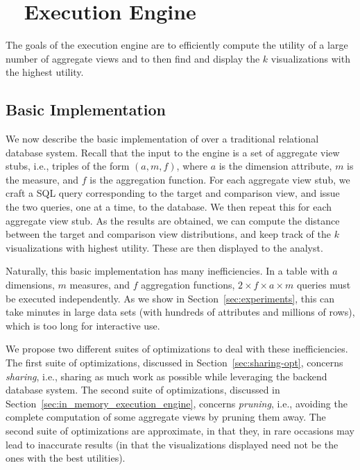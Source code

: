 \section{{\large \SeeDB\ } Execution Engine}
The goals of the \SeeDB execution engine are to efficiently
compute the utility of a large number of aggregate views
and to then find and display the $k$ visualizations with the highest utility.

\subsection{Basic Implementation} \label{sec:dbms-exec-engine}

We now describe the basic implementation of \SeeDB
over a traditional relational database system.
Recall that the input to the \SeeDB engine is a set of 
aggregate view stubs, i.e., triples of the form
$(a, m, f)$, where $a$ is the dimension attribute, $m$ is the measure,
and $f$ is the aggregation function.
For each aggregate view stub, we craft
a SQL query corresponding to the target
and comparison view, and issue
the two queries, one at a time, to the database.
We then repeat this for each aggregate view stub.
As the results are obtained, we can compute the
distance between the target and comparison view
distributions, and keep track of the $k$ visualizations
with highest utility. These are then displayed
to the analyst.


Naturally, this basic implementation has many inefficiencies.
In a table with $a$ dimensions, $m$ measures, and $f$ aggregation functions, 
$2\times f \times a \times  m$ queries must be executed independently.  
As we show in Section~\ref{sec:experiments}, this can take minutes in
large data sets (with hundreds of attributes and millions of rows), which is too long for interactive use.

We propose two different suites of optimizations to deal with these
inefficiencies.
The first suite of optimizations, discussed in Section~\ref{sec:sharing-opt}, concerns {\em sharing},
i.e., sharing as much work as possible while leveraging the 
backend database system.
The second suite of optimizations, discussed in Section~\ref{sec:in_memory_execution_engine}, concerns {\em pruning},
i.e., avoiding the complete computation of some aggregate views
by pruning them away. The second suite of optimizations
are approximate, in that they, in rare occasions may lead
to inaccurate results (in that the visualizations
displayed need not be the ones with the best utilities).

